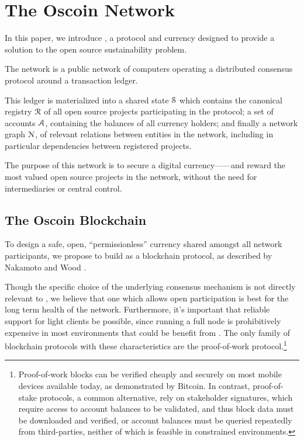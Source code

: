 \section{The Oscoin Network}
\label{s:oscoin}

\noindent In this paper, we introduce \oscoin{}, a protocol and currency
designed to provide a solution to the open source sustainability problem.

The \oscoin{} network is a public network of computers operating a distributed
consensus protocol around a transaction ledger.

This ledger is materialized into a shared state $\mathcal{S}$ which
contains the canonical registry $\mathcal{R}$ of all open source
projects participating in the protocol; a set of accounts
$\mathcal{A}$, containing the balances of all currency holders; and
finally a network graph $\mathcal{N}$, of relevant relations between
entities in the network, including in particular dependencies between
registered projects.

The purpose of this network is to secure a digital currency---\oscoin{}---and
reward the most valued open source projects in the network, without the need
for intermediaries or central control.

\subsection{The Oscoin Blockchain}

To design a safe, open, ``permissionless'' currency shared amongst all network
participants, we propose to build \oscoin{} as a blockchain protocol, as
described by Nakamoto \cite{bitcoin} and Wood \cite{ethereum}.

Though the specific choice of the underlying consensus mechanism is not
directly relevant to \oscoin{}, we believe that one which allows open
participation is best for the long term health of the network. Furthermore,
it's important that reliable support for light clients be possible, since
running a full node is prohibitively expensive in most environments that could
be benefit from \oscoin{}. The only family of blockchain protocols with these
characteristics are the proof-of-work protocol.\footnote{Proof-of-work blocks
can be verified cheaply and securely on most mobile devices available
today, as demonstrated by Bitcoin. In contrast, proof-of-stake protocols,
a common alternative, rely on stakeholder signatures, which require access to
account balances to be validated, and thus block data must be downloaded and
verified, or account balances must be queried repeatedly from third-parties,
neither of which is feasible in constrained environments.}

